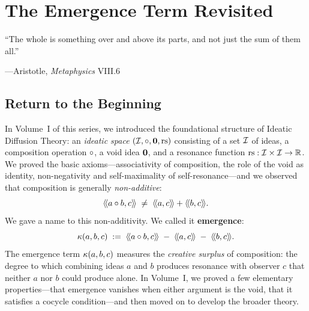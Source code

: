 %


\chapter{The Emergence Term Revisited}
\label{ch:emergence-revisited}

\epigraph{``The whole is something over and above its parts,
and not just the sum of them all.''}
{---Aristotle, \emph{Metaphysics} VIII.6}


\section{Return to the Beginning}

In Volume~I of this series, we introduced the foundational structure of Ideatic
Diffusion Theory: an \emph{ideatic space} $(\mathcal{I}, \circ, \mathbf{0}, \mathrm{rs})$
consisting of a set $\mathcal{I}$ of ideas, a composition operation $\circ$, a void
idea $\mathbf{0}$, and a resonance function $\mathrm{rs} : \mathcal{I} \times \mathcal{I} \to \mathbb{R}$.
We proved the basic axioms---associativity of composition, the role of the void
as identity, non-negativity and self-maximality of self-resonance---and we
observed that composition is generally \emph{non-additive}:
\[
  \langle\!\langle a \circ b, c \rangle\!\rangle \;\neq\; \langle\!\langle a, c \rangle\!\rangle + \langle\!\langle b, c \rangle\!\rangle.
\]
We gave a name to this non-additivity. We called it \textbf{emergence}:
\[
  \kappa(a, b, c) \;:=\; \langle\!\langle a \circ b, c \rangle\!\rangle \;-\; \langle\!\langle a, c \rangle\!\rangle \;-\; \langle\!\langle b, c \rangle\!\rangle.
\]
The emergence term $\kappa(a,b,c)$ measures the \emph{creative surplus} of
composition: the degree to which combining ideas $a$ and $b$ produces resonance
with observer $c$ that neither $a$ nor $b$ could produce alone. In Volume~I,
we proved a few elementary properties---that emergence vanishes when either
argument is the void, that it satisfies a cocycle condition---and then moved on
to develop the broader theory.

